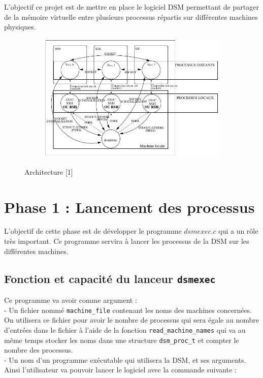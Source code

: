 L'objectif ce projet est de mettre en place le logiciel DSM permettant de partager de la mémoire virtuelle entre plusieurs processus répartis sur différentes machines physiques.
\begin{figure}[H]
     \centering
     \begin{subfigure}[H]{0.9\textwidth}
         \centering
         \includegraphics[width=\textwidth]{Archi.png}
     \end{subfigure}
     \caption{Architecture [1]}
\end{figure}

\newpage
\section{Phase 1 : Lancement des processus}
\setlength{\parindent}{5ex}
L'objectif de cette phase est de développer le programme $dsmexec.c$ qui a un rôle très important. Ce programme servira à lancer les processus de la DSM sur les différentes machines.

\subsection{Fonction et capacité du lanceur \texttt{dsmexec}}
\setlength{\parindent}{5ex}
Ce programme va avoir comme argument :\\
- Un fichier nommé \texttt{machine\_file} contenant les noms des machines concernées. On utilisera ce fichier pour avoir le nombre de processus qui sera égale au nombre d'entrées dans le fichier à l'aide de la fonction \texttt{read\_machine\_names} qui va au même temps stocker les noms dans une structure \texttt{dsm\_proc\_t} et compter le nombre des processus.\\
- Un nom d'un programme exécutable qui utilisera la DSM, et ses arguments.\\
Ainsi l'utilisateur va pouvoir lancer le logiciel avec la commande suivante :
\begin{center}
\end{center} \\
\setlength{\parindent}{5ex}

